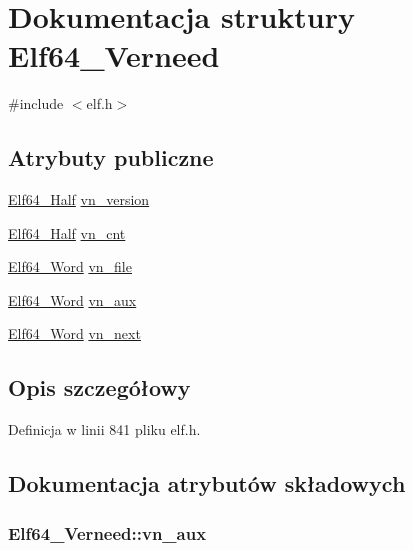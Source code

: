 \hypertarget{struct_elf64___verneed}{\section{Dokumentacja struktury Elf64\-\_\-\-Verneed}
\label{struct_elf64___verneed}
}


{\ttfamily \#include $<$elf.\-h$>$}

\subsection*{Atrybuty publiczne}
\begin{DoxyCompactItemize}
\item 
\hyperlink{elf_8h_adb6a5584018b431da3472e7c6a7fd731}{Elf64\-\_\-\-Half} \hyperlink{struct_elf64___verneed_abbe3d560e7f69253f3c468f2c9d30f99}{vn\-\_\-version}
\item 
\hyperlink{elf_8h_adb6a5584018b431da3472e7c6a7fd731}{Elf64\-\_\-\-Half} \hyperlink{struct_elf64___verneed_ab8bae5b901cc7007685f35d43cf63884}{vn\-\_\-cnt}
\item 
\hyperlink{elf_8h_aa3aa1920ed115b7ef7e99716fece4401}{Elf64\-\_\-\-Word} \hyperlink{struct_elf64___verneed_acb9149fec79d7eefb3f1d6300be2125f}{vn\-\_\-file}
\item 
\hyperlink{elf_8h_aa3aa1920ed115b7ef7e99716fece4401}{Elf64\-\_\-\-Word} \hyperlink{struct_elf64___verneed_a0b9d3ccbab06cb391f169987b1dbff0f}{vn\-\_\-aux}
\item 
\hyperlink{elf_8h_aa3aa1920ed115b7ef7e99716fece4401}{Elf64\-\_\-\-Word} \hyperlink{struct_elf64___verneed_a8036329a9f5ad3a4006f16cbe3c9e866}{vn\-\_\-next}
\end{DoxyCompactItemize}


\subsection{Opis szczegółowy}


Definicja w linii 841 pliku elf.\-h.



\subsection{Dokumentacja atrybutów składowych}
\hypertarget{struct_elf64___verneed_a0b9d3ccbab06cb391f169987b1dbff0f}{
\subsubsection[{vn\-\_\-aux}]{ Elf64\-\_\-\-Verneed\-::vn\-\_\-aux}}\label{struct_elf64___verneed_a0b9d3ccbab06cb391f169987b1dbff0f}


